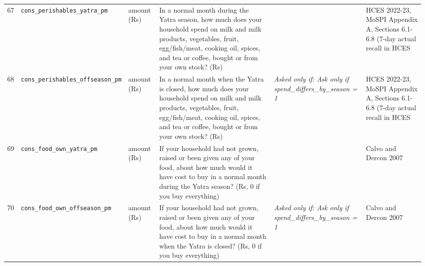 \documentclass[9pt,a4paper,landscape]{article}
\begin{document}
\begin{longtable}{@{}p{0.5cm}p{3.3cm}p{1.7cm}p{7.3cm}p{5.6cm}p{5.4cm}@{}}
\footnotesize 67 & \footnotesize\texttt{cons\_perishables\_yatra\_pm} & \scriptsize amount (Rs) & \footnotesize In a normal month during the Yatra season, how much does your household spend on milk and milk products, vegetables, fruit, egg/fish/meat, cooking oil, spices, and tea or coffee, bought or from your own stock? (Rs)\par\vspace{1pt}{\footnotesize\color{hdr}{\hifont यात्रा के मौसम के आम महीने में, आप (और जो यहाँ आपके साथ रहते हैं) दूध और दूध की चीज़ें, सब्ज़ी, फल, अंडा/मछली/मांस, तेल, मसाले, और चाय पर कितना ख़र्च करते हैं? (रुपये)}} & \scriptsize  & \scriptsize HCES 2022-23, MoSPI Appendix A, Sections 6.1-6.8 (7-day actual recall in HCES\\
\footnotesize 68 & \footnotesize\texttt{cons\_perishables\_offseason\_pm} & \scriptsize amount (Rs) & \footnotesize In a normal month when the Yatra is closed, how much does your household spend on milk and milk products, vegetables, fruit, egg/fish/meat, cooking oil, spices, and tea or coffee, bought or from your own stock? (Rs)\par\vspace{1pt}{\footnotesize\color{hdr}{\hifont जब यात्रा बंद रहती है, उस आम महीने में आपका घर दूध और दूध की चीज़ें, सब्ज़ी, फल, अंडा/मछली/मांस, तेल, मसाले, और चाय पर कितना ख़र्च करता है? (रुपये)}} & \scriptsize \textit{Asked only if: Ask only if spend\_differs\_by\_season = 1} & \scriptsize HCES 2022-23, MoSPI Appendix A, Sections 6.1-6.8 (7-day actual recall in HCES\\
\footnotesize 69 & \footnotesize\texttt{cons\_food\_own\_yatra\_pm} & \scriptsize amount (Rs) & \footnotesize If your household had not grown, raised or been given any of your food, about how much would it have cost to buy in a normal month during the Yatra season? (Rs, 0 if you buy everything)\par\vspace{1pt}{\footnotesize\color{hdr}{\hifont अगर आप (और जो यहाँ आपके साथ रहते हैं) अपना खाना ख़ुद न उगाते, न पालते और न किसी से मिलता, तो यात्रा के मौसम के आम महीने में उसे ख़रीदने में लगभग कितना लगता? (रुपये, सब ख़रीदते हों तो 0)}} & \scriptsize  & \scriptsize Calvo and Dercon 2007\\
\footnotesize 70 & \footnotesize\texttt{cons\_food\_own\_offseason\_pm} & \scriptsize amount (Rs) & \footnotesize If your household had not grown, raised or been given any of your food, about how much would it have cost to buy in a normal month when the Yatra is closed? (Rs, 0 if you buy everything)\par\vspace{1pt}{\footnotesize\color{hdr}{\hifont अगर आपका घर अपना खाना ख़ुद न उगाता, न पालता और न किसी से मिलता, तो जब यात्रा बंद रहती है उस आम महीने में उसे ख़रीदने में लगभग कितना लगता? (रुपये, सब ख़रीदते हों तो 0)}} & \scriptsize \textit{Asked only if: Ask only if spend\_differs\_by\_season = 1} & \scriptsize Calvo and Dercon 2007\\

\end{longtable}
\end{document}
